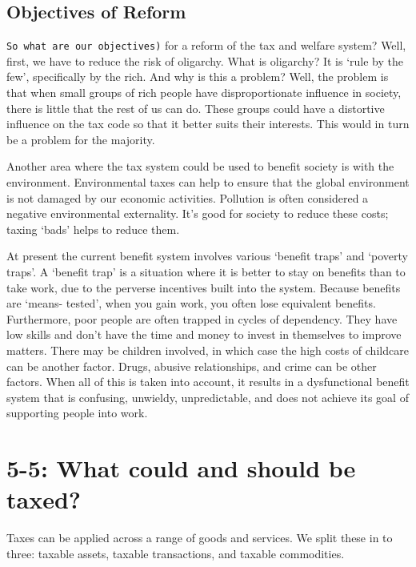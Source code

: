 \documentclass[]{tufte-handout}
\begin{document}
\hypertarget{objectives-of-reform}{%
\subsection{Objectives of Reform}\label{objectives-of-reform}}

\texttt{So\ what\ are\ our\ objectives)} for a reform of the tax and
welfare system? Well, first, we have to reduce the risk of oligarchy.
What is oligarchy? It is `rule by the few', specifically by the rich.
And why is this a problem? Well, the problem is that when small groups
of rich people have disproportionate influence in society, there is
little that the rest of us can do. These groups could have a distortive
influence on the tax code so that it better suits their interests. This
would in turn be a problem for the majority.

Another area where the tax system could be used to benefit society is
with the environment. Environmental taxes can help to ensure that the
global environment is not damaged by our economic activities. Pollution
is often considered a negative environmental externality. It's good for
society to reduce these costs; taxing `bads' helps to reduce them.

At present the current benefit system involves various `benefit traps'
and `poverty traps'. A `benefit trap' is a situation where it is better
to stay on benefits than to take work, due to the perverse incentives
built into the system. Because benefits are `means- tested', when you
gain work, you often lose equivalent benefits. Furthermore, poor people
are often trapped in cycles of dependency. They have low skills and
don't have the time and money to invest in themselves to improve
matters. There may be children involved, in which case the high costs of
childcare can be another factor. Drugs, abusive relationships, and crime
can be other factors. When all of this is taken into account, it results
in a dysfunctional benefit system that is confusing, unwieldy,
unpredictable, and does not achieve its goal of supporting people into
work.

\hypertarget{what-could-and-should-be-taxed}{%
\section{5-5: What could and should be
taxed?}\label{what-could-and-should-be-taxed}}

Taxes can be applied across a range of goods and services. We split
these in to three: taxable assets, taxable transactions, and taxable
commodities.
\end{document}
